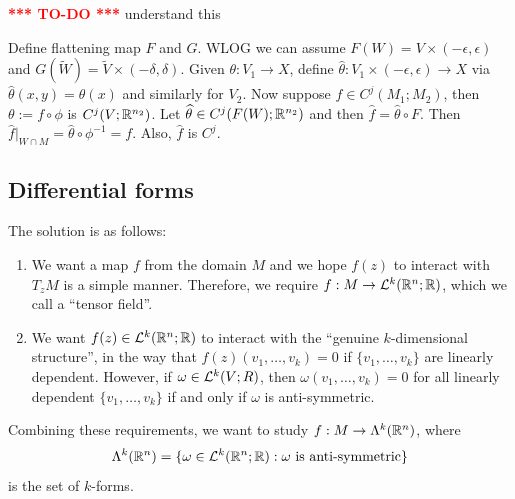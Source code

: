 \documentclass[a4paper]{article}
\newcommand{\TODO}{\textcolor{red}{\textbf{*** TO-DO ***}}}
\begin{document}
\TODO \; understand this

Define flattening map $F$ and $G$. WLOG we can assume 
$F(W) = V \times (-\epsilon, \epsilon)$ and 
$G(\tilde{W}) = \tilde{V} \times (-\delta, \delta)$.
Given $\theta: V_1 \to X$, define $\hat{\theta} : 
V_1 \times (-\epsilon, \epsilon) \to X$ via 
$\hat{\theta}(x, y) = \theta(x)$ and similarly for $V_2$.
Now suppose $f \in C^j (M_1 ; M_2)$, then 
$\theta := f \circ \phi$ is $C^j(V; \mathbb{R}^{n_2})$.
Let $\widehat{\theta} \in C^j (F(W) ; \mathbb{R}^{n_2})$ 
and then $\hat{f} = \hat{\theta} \circ F$. 
Then $\hat{f} \vert_{W \cap M} = \hat{\theta} \circ\phi^{-1}
= f$. Also, $\hat{f}$ is $C^j$.


\subsection{Differential forms}

The solution is as follows: 
\begin{enumerate}
\item We want a map $f$ from the domain $M$ and we hope 
$f(z)$ to interact with $T_z M$ is a simple manner. 
Therefore, we require $f : M \to \mathcal{L}^k(\mathbb{R}^n ; \mathbb{R})$, which we call 
a ``tensor field''.

\item We want $f(z) \in \mathcal{L}^k(\mathbb{R}^n ; \mathbb{R})$ to interact 
with the ``genuine $k$-dimensional structure'', in the way 
that $f(z) (v_1, \dots, v_k) = 0$ if $\{v_1, \dots, v_k\}$
are linearly dependent. However, if 
$\omega \in \mathcal{L}^k (V ; R)$, then $\omega (v_1, \dots, v_k) = 0$
for all linearly dependent $\{v_1, \dots, v_k\}$ 
if and only if $\omega$ is anti-symmetric.
\end{enumerate}
Combining these requirements, we want to 
study $f : M \to \Lambda^k (\mathbb{R}^n)$, where 
\[
\Lambda^k (\mathbb{R}^n) 
= \{\omega \in \mathcal{L}^k(\mathbb{R}^n ; \mathbb{R}) : \omega \text{ is 
anti-symmetric}\}
\]
is the set of $k$-forms.
\end{document}
